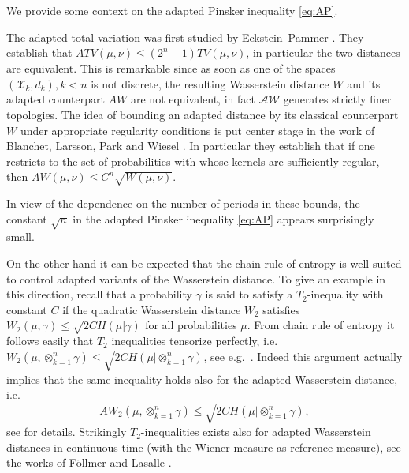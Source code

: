 \documentclass[10pt, A4paper]{amsart}
\theoremstyle{definition}
\newcommand{\AW}{\mathcal A\mathcal W}
\newcommand{\X}{\mathcal X}
\numberwithin{equation}{section}
\begin{document}
\pagebreak

\medskip

We provide some context on the adapted Pinsker inequality \eqref{eq:AP}. 

The adapted total variation was first studied by Eckstein--Pammer \cite{EcPa22}. They establish that  $ATV(\mu, \nu)\leq (2^n -1) TV(\mu, \nu)$,  %
in particular the two distances are equivalent. 
This is remarkable since as soon as one of the spaces $(\X_k, d_k), k < n$ is not discrete, the resulting Wasserstein distance $W$ and its adapted counterpart $AW$ are not equivalent, in fact $\AW$ generates strictly finer topologies. 
The idea of bounding an adapted distance by its classical counterpart $W$ under appropriate regularity conditions is put center stage in the work of Blanchet, Larsson, Park and Wiesel \cite{BlLaPaWi24}. In particular they establish that  if one restricts to the set of probabilities with whose kernels are sufficiently regular,  then $AW(\mu, \nu)\leq C^n \sqrt{W(\mu, \nu)}$.

In view of the  dependence on the number of periods in these bounds,  the constant $\sqrt{n}$ in the adapted Pinsker inequality \eqref{eq:AP} appears  surprisingly small. 

On the other hand it can be expected that the chain rule  of entropy is well suited to control adapted variants of the Wasserstein distance. To give an example in this direction, recall that a probability $\gamma$ is said to satisfy a $T_2$-inequality with constant $C$ if the quadratic Wasserstein distance $W_2$ satisfies $W_2(\mu, \gamma) \leq \sqrt{2C H(\mu|\gamma)}$ for all probabilities $\mu$. From chain rule of entropy it follows easily that $T_2$ inequalities tensorize perfectly, i.e.\ $W_2(\mu, \otimes_{k=1}^n\gamma) \leq \sqrt{2C H(\mu|\otimes_{k=1}^n\gamma)}$, see e.g.\ \cite[Proposition 22.5]{Vi09}. Indeed this argument actually implies that the same inequality holds also for the adapted Wasserstein distance, i.e.\ $$AW_2(\mu, \otimes_{k=1}^n\gamma) \leq \sqrt{2C H(\mu|\otimes_{k=1}^n\gamma)},$$ see \cite[Section 5.2]{BaBeLiZa17}  for details. Strikingly $T_2$-inequalities exists also for adapted Wasserstein distances in continuous time (with the Wiener measure as reference measure), see the works of Föllmer \cite{Fo22a} and Lasalle \cite{La18}.
\end{document}
